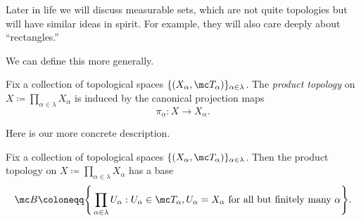 \documentclass[../notes.tex]{subfiles}
\begin{document}
\begin{remark}
	Later in life we will discuss measurable sets, which are not quite topologies but will have similar ideas in spirit. For example, they will also care deeply about ``rectangles.''
\end{remark}
We can define this more generally.
\begin{defihelper} 
	Fix a collection of topological spaces $\{(X_\alpha,\mc T_\alpha)\}_{\alpha\in\lambda}$. The \textit{product topology} on $X\coloneqq\prod_{\alpha\in\lambda}X_\alpha$ is induced by the canonical projection maps
	\[\pi_\alpha\colon X\to X_\alpha.\]
\end{defihelper}
Here is our more concrete description.
\begin{lemma} \label{lem:prodtopbase}
	Fix a collection of topological spaces $\{(X_\alpha,\mc T_\alpha)\}_{\alpha\in\lambda}$. Then the product topology on $X\coloneqq\prod_{\alpha\in\lambda}X_\alpha$ has a base
	\[\mc B\coloneqq\Bigg\{\prod_{\alpha\in\lambda}U_\alpha:U_\alpha\in\mc T_\alpha,U_\alpha=X_\alpha\text{ for all but finitely many }\alpha\Bigg\}.\]
\end{lemma}
\end{document}
